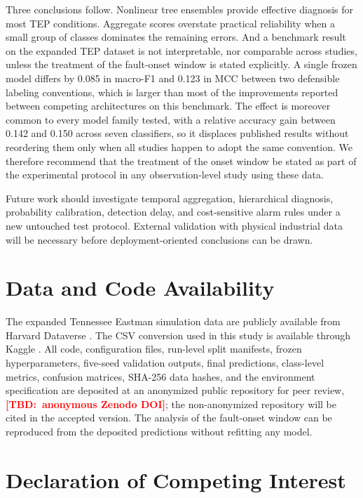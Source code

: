 \documentclass[12pt,a4paper]{article}
\newcommand{\TBD}[1]{\textcolor{red}{\textbf{[TBD:~#1]}}}
\begin{document}
Three conclusions follow. Nonlinear tree ensembles provide effective diagnosis
for most TEP conditions. Aggregate scores overstate practical reliability when
a small group of classes dominates the remaining errors. And a benchmark result
on the expanded TEP dataset is not interpretable, nor comparable across
studies, unless the treatment of the fault-onset window is stated explicitly.
A single frozen model differs by 0.085 in macro-F1 and 0.123 in MCC between two
defensible labeling conventions, which is larger than most of the improvements
reported between competing architectures on this benchmark. The effect is
moreover common to every model family tested, with a relative accuracy gain
between 0.142 and 0.150 across seven classifiers, so it displaces published
results without reordering them only when all studies happen to adopt the same
convention. We therefore
recommend that the treatment of the onset window be stated as part of the
experimental protocol in any observation-level study using these data.

Future work should investigate temporal aggregation, hierarchical diagnosis,
probability calibration, detection delay, and cost-sensitive alarm rules under
a new untouched test protocol. External validation with physical industrial
data will be necessary before deployment-oriented conclusions can be drawn.

\section*{Data and Code Availability}

The expanded Tennessee Eastman simulation data are publicly available from
Harvard Dataverse \cite{rieth2017data}. The CSV conversion used in this study is
available through Kaggle \cite{kaggleTEP}. All code, configuration files,
run-level split manifests, frozen hyperparameters, five-seed validation
outputs, final predictions, class-level metrics, confusion matrices, SHA-256
data hashes, and the environment specification are deposited at
an anonymized public repository for peer review, \TBD{anonymous Zenodo DOI};
the non-anonymized repository will be cited in the accepted version. The analysis of the
fault-onset window can be reproduced from the deposited predictions without
refitting any model.


\section*{Declaration of Competing Interest}
\end{document}
